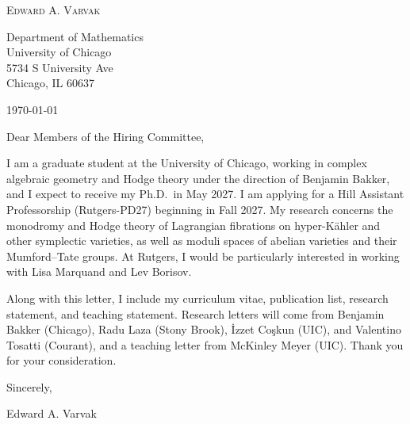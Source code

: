 \documentclass[12pt]{article}
\begin{document}
\begin{center}
  {\Large\textsc{Edward A. Varvak}}\\[10pt]
\end{center}

Department of Mathematics \\
University of Chicago \\
5734 S University Ave \\
Chicago, IL 60637

\today

Dear Members of the Hiring Committee,

I am a graduate student at the University of Chicago, working in complex
algebraic geometry and Hodge theory under the direction of Benjamin Bakker,
and I expect to receive my Ph.D.\ in May 2027. I am applying for a Hill
Assistant Professorship (\mbox{Rutgers-PD27}) beginning in Fall 2027. My
research concerns the monodromy and Hodge theory of Lagrangian fibrations on
hyper-K\"ahler and other symplectic varieties, as well as moduli spaces of
abelian varieties and their Mumford--Tate groups. At Rutgers, I would be
particularly interested in working with Lisa Marquand and Lev Borisov.

Along with this letter, I include my curriculum vitae, publication list,
research statement, and teaching statement. Research letters will come from
Benjamin Bakker (Chicago), Radu Laza (Stony Brook), \.{I}zzet Co\c{s}kun
(UIC), and Valentino Tosatti (Courant), and a teaching letter from McKinley
Meyer (UIC). Thank you for your consideration.

Sincerely,

Edward A. Varvak
\end{document}
